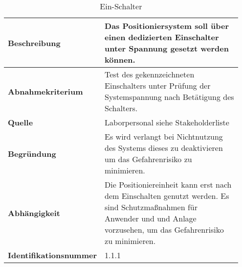 \documentclass[../Bachelorarbeit.tex]{subfiles}
\begin{document}
\begin{table}[ht]
    \centering
    \begin{tabular}{| p{0.35\linewidth} | p{0.6\linewidth} |}
        \hline
        \textbf{Beschreibung} & Das Positioniersystem soll über einen dedizierten Einschalter unter Spannung gesetzt werden können. \\ \hline
        \textbf{Abnahmekriterium} & Test des gekennzeichneten Einschalters unter Prüfung der Systemspannung nach Betätigung des Schalters. \\ \hline
        \textbf{Quelle} & Laborpersonal siehe Stakeholderliste \\ \hline
        \textbf{Begründung} & Es wird verlangt bei Nichtnutzung des Systems dieses zu deaktivieren um das Gefahrenrisiko zu minimieren. \\ \hline
        \textbf{Abhängigkeit} & Die Positioniereinheit kann erst nach dem Einschalten genutzt werden. Es sind Schutzmaßnahmen für Anwender und und Anlage vorzusehen, um das Gefahrenrisiko zu minimieren. \\ \hline
        \textbf{Identifikationsnummer} & 1.1.1 \\ \hline
    \end{tabular}
    \caption{Ein-Schalter}
    \label{tab:my-table}
\end{table}

\end{document}
